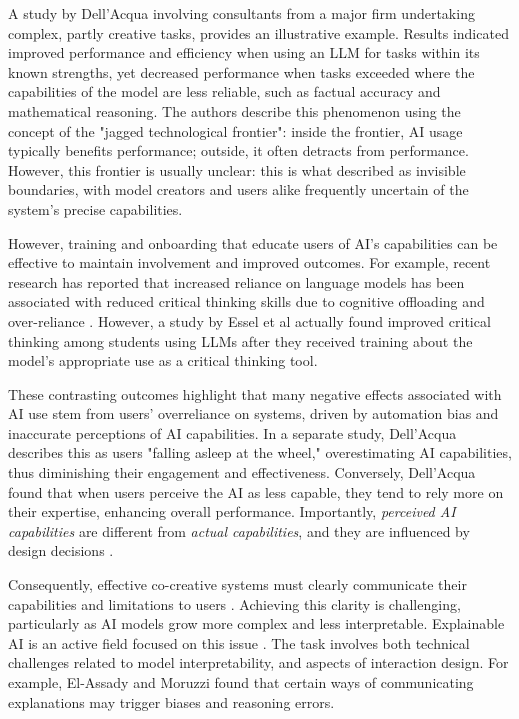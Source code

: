 A study by Dell'Acqua \cite{DellAcqua2023-og} involving consultants from a major firm undertaking complex, partly creative tasks, provides an illustrative example. Results indicated improved performance and efficiency when using an LLM for tasks within its known strengths, yet decreased performance when tasks exceeded where the capabilities of the model are less reliable, such as factual accuracy and mathematical reasoning. The authors describe this phenomenon using the concept of the "jagged technological frontier": inside the frontier, AI usage typically benefits performance; outside, it often detracts from performance. However, this frontier is usually unclear: this is what \cite{Buschek2021-ks} described as invisible boundaries, with model creators and users alike frequently uncertain of the system's precise capabilities.

However, training and onboarding that educate users of AI's capabilities can be effective to maintain involvement and improved outcomes. For example, recent research has reported that increased reliance on language models has been associated with reduced critical thinking skills due to cognitive offloading and over-reliance \cite{Gerlich2025-as, Lee2025-dw}. However, a study by Essel et al \cite{Essel2024-qc} actually found improved critical thinking among students using LLMs after they received training about the model's appropriate use as a critical thinking tool.

These contrasting outcomes highlight that many negative effects associated with AI use stem from users' overreliance on systems, driven by automation bias and inaccurate perceptions of AI capabilities. In a separate study, Dell'Acqua \cite{Dell-Acqua2022-dy} describes this as users "falling asleep at the wheel," overestimating AI capabilities, thus diminishing their engagement and effectiveness. Conversely, Dell'Acqua found that when users perceive the AI as less capable, they tend to rely more on their expertise, enhancing overall performance. Importantly, \textit{perceived AI capabilities} are different from \textit{actual capabilities}, and they are influenced by design decisions \cite{Moruzzi2022-tx, Lawton2023-tb}.

Consequently, effective co-creative systems must clearly communicate their capabilities and limitations to users \cite{Buschek2021-ks}. Achieving this clarity is challenging, particularly as AI models grow more complex and less interpretable. Explainable AI is an active field focused on this issue \cite{Zhu2018-zd, Llano2022-ti, Newn2020-mv, Shneiderman2020-je, Linardatos2020-uq, El-Assady2022-qc, Gomez2023-bp}. The task involves both technical challenges related to model interpretability, and aspects of interaction design. For example, El-Assady and Moruzzi \cite{El-Assady2022-qc} found that certain ways of communicating explanations may trigger biases and reasoning errors.

